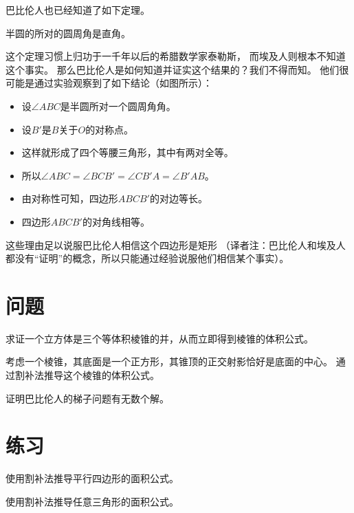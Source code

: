 \documentclass[cn,fancy,blue,11pt]{elegantbook}
\begin{document}
巴比伦人也已经知道了如下定理。
\begin{theorem*}{}{}
	半圆的所对的圆周角是直角。
\end{theorem*}

这个定理习惯上归功于一千年以后的希腊数学家泰勒斯，
而埃及人则根本不知道这个事实。
那么巴比伦人是如何知道并证实这个结果的？我们不得而知。
他们很可能是通过实验观察到了如下结论（如图所示）：
\begin{itemize}
	\item 设$\angle ABC$是半圆所对一个圆周角角。
	\item 设$B'$是$B$关于$O$的对称点。
	\item 这样就形成了四个等腰三角形，其中有两对全等。
	\item 所以$\angle ABC=\angle BCB'=\angle CB'A=\angle B'AB$。
	\item 由对称性可知，四边形$ABCB'$的对边等长。
	\item 四边形$ABCB'$的对角线相等。
\end{itemize}
这些理由足以说服巴比伦人相信这个四边形是矩形
（译者注：巴比伦人和埃及人都没有``证明''的概念，所以只能通过经验说服他们相信某个事实）。

\section{问题}

\begin{problem}
	求证一个立方体是三个等体积棱锥的并，从而立即得到棱锥的体积公式。
\end{problem}

\begin{problem}
	考虑一个棱锥，其底面是一个正方形，其锥顶的正交射影恰好是底面的中心。
	通过割补法推导这个棱锥的体积公式。
\end{problem}

\begin{problem}
	证明巴比伦人的梯子问题有无数个解。
\end{problem}

\section{练习}

\begin{exercise}
	使用割补法推导平行四边形的面积公式。
\end{exercise}

\begin{exercise}
	使用割补法推导任意三角形的面积公式。
\end{exercise}
\end{document}
